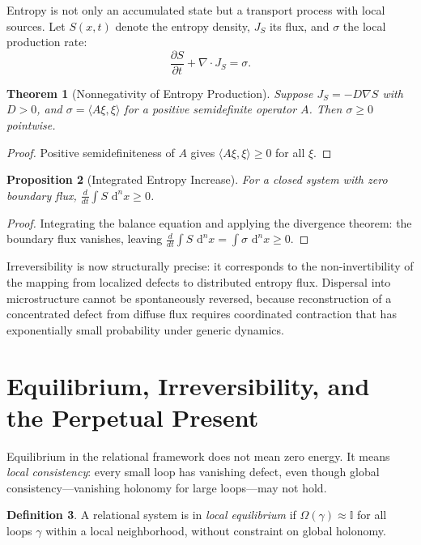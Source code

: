 \documentclass[12pt,a4paper,openany]{book}
\theoremstyle{plain}
\newtheorem{theorem}{Theorem}[chapter]
\newtheorem{proposition}[theorem]{Proposition}
\theoremstyle{definition}
\newtheorem{definition}[theorem]{Definition}
\theoremstyle{remark}
\newcommand{\id}{\mathbb{I}}
\newcommand{\defect}{\Omega}
\newcommand{\dvol}{\,\mathrm{d}^n x}
\begin{document}
Entropy is not only an accumulated state but a transport process with local sources. Let $S(x,t)$ denote the entropy density, $J_S$ its flux, and $\sigma$ the local production rate:
\[
\frac{\partial S}{\partial t} + \nabla \cdot J_S = \sigma.
\]

\begin{theorem}[Nonnegativity of Entropy Production]
Suppose $J_S = -D\nabla S$ with $D > 0$, and $\sigma = \langle A\xi,\xi\rangle$ for a positive semidefinite operator $A$. Then $\sigma \ge 0$ pointwise.
\end{theorem}

\begin{proof}
Positive semidefiniteness of $A$ gives $\langle A\xi,\xi\rangle \ge 0$ for all $\xi$.
\end{proof}

\begin{proposition}[Integrated Entropy Increase]
For a closed system with zero boundary flux, $\frac{d}{dt}\int S\,\dvol \ge 0$.
\end{proposition}

\begin{proof}
Integrating the balance equation and applying the divergence theorem: the boundary flux vanishes, leaving $\frac{d}{dt}\int S\,\dvol = \int\sigma\,\dvol \ge 0$.
\end{proof}

Irreversibility is now structurally precise: it corresponds to the non-invertibility of the mapping from localized defects to distributed entropy flux. Dispersal into microstructure cannot be spontaneously reversed, because reconstruction of a concentrated defect from diffuse flux requires coordinated contraction that has exponentially small probability under generic dynamics.



\section{Equilibrium, Irreversibility, and the Perpetual Present}

Equilibrium in the relational framework does not mean zero energy. It means \emph{local consistency}: every small loop has vanishing defect, even though global consistency---vanishing holonomy for large loops---may not hold.

\begin{definition}
A relational system is in \emph{local equilibrium} if $\defect(\gamma) \approx \id$ for all loops $\gamma$ within a local neighborhood, without constraint on global holonomy.
\end{definition}
\end{document}
